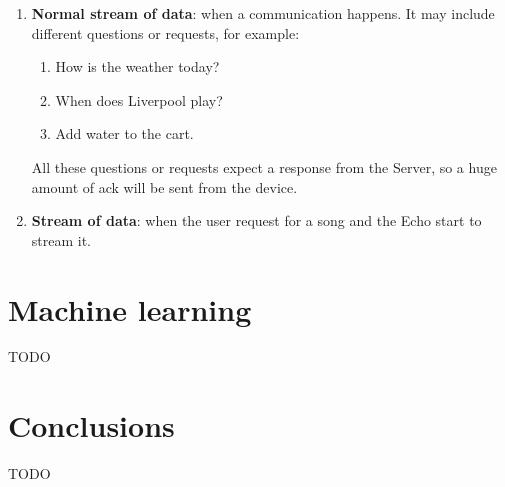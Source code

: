 \documentclass[sigconf]{acmart}
\begin{document}
\begin{enumerate}
        \item \textbf{Normal stream of data}: when a communication happens.
        It may include different questions or requests, for example:
        \begin{enumerate}
            \item How is the weather today?
            \item When does Liverpool play?
            \item Add water to the cart.
        \end{enumerate}
        All these questions or requests expect a response from the Server, so a huge amount of ack will be sent from the device.
        \item \textbf{Stream of data}: when the user request for a song and the Echo start to stream it.
    \end{enumerate}


    \section{Machine learning}
    TODO


    \section{Conclusions}
    TODO

    
    
\end{document}

